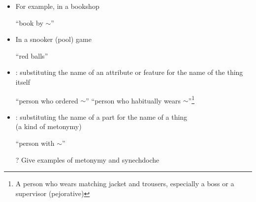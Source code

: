 \documentclass[a4paper,landscape,headrule,footrule,xetex]{foils}
\begin{document}

\begin{itemize}\addtolength{\itemsep}{-1.5ex}
\item For example, in a bookshop
  \begin{exe}
    \ex {} \textnormal{``book by $\sim$''}
  \end{exe}
\item In a snooker (pool)  game
  \begin{exe}
    \ex {} ``red balls''
  \end{exe}
\item {}: substituting the name of an attribute or feature for the name of the thing itself
  \begin{exe}
    \ex {} ``person who ordered $\sim$''
    \ex {} ``person who
    habitually wears $\sim$''\footnote{ A person who wears matching
      jacket and trousers, especially a boss or a supervisor (pejorative)}
  \end{exe}
  \item {}: substituting the name of a part for the name of a thing \\
    (a kind of metonymy)
  \begin{exe}
    \ex {} ``person with $\sim$''
  \end{exe}
\item[?] Give examples of metonymy and synechdoche\task

\end{itemize}
\end{document}
